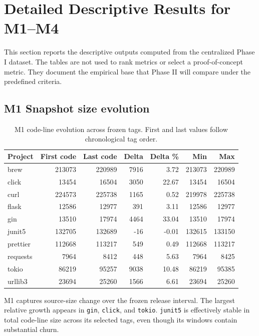 \section{Detailed Descriptive Results for M1--M4}
\label{sec:phase1_detailed_results}

This section reports the descriptive outputs computed from the centralized Phase I dataset.
The tables are not used to rank metrics or select a proof-of-concept metric. They document
the empirical base that Phase II will compare under the predefined criteria.

\subsection{M1 Snapshot size evolution}
\label{sec:results_m1}

\begin{table}[H]
\centering
\scriptsize
\renewcommand{\arraystretch}{1.12}
\begin{tabular}{lrrrrrr}
\toprule
\textbf{Project} & \textbf{First code} & \textbf{Last code} & \textbf{Delta} & \textbf{Delta \%} & \textbf{Min} & \textbf{Max} \\
\midrule
brew     & 213073 & 220989 & 7916  & 3.72  & 213073 & 220989 \\
click    & 13454  & 16504  & 3050  & 22.67 & 13454  & 16504  \\
curl     & 224573 & 225738 & 1165  & 0.52  & 219978 & 225738 \\
flask    & 12586  & 12977  & 391   & 3.11  & 12586  & 12977  \\
gin      & 13510  & 17974  & 4464  & 33.04 & 13510  & 17974  \\
junit5   & 132705 & 132689 & -16   & -0.01 & 132615 & 133150 \\
prettier & 112668 & 113217 & 549   & 0.49  & 112668 & 113217 \\
requests & 7964   & 8412   & 448   & 5.63  & 7964   & 8425   \\
tokio    & 86219  & 95257  & 9038  & 10.48 & 86219  & 95385  \\
urllib3  & 23694  & 25260  & 1566  & 6.61  & 23694  & 25260  \\
\bottomrule
\end{tabular}
\caption{M1 code-line evolution across frozen tags. First and last values follow chronological tag order.}
\label{tab:m1_detailed}
\end{table}

M1 captures source-size change over the frozen release interval. The largest relative growth appears in
\texttt{gin}, \texttt{click}, and \texttt{tokio}. \texttt{junit5} is effectively stable in total code-line
size across its selected tags, even though its windows contain substantial churn.


